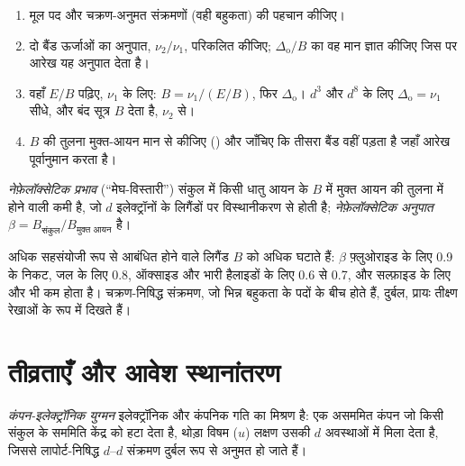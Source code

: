 \begin{method}[तानाबे--सुगानो आरेख पढ़ना]\label{met:b3:complex-spectra-magnetism:read-ts}
\begin{enumerate}
  \item मूल पद और चक्रण-अनुमत संक्रमणों (वही
        बहुकता) की पहचान कीजिए।
  \item दो बैंड ऊर्जाओं का अनुपात, $\nu_2/\nu_1$, परिकलित कीजिए; $\Delta_{\mathrm o}/B$ का वह मान ज्ञात कीजिए
        जिस पर आरेख यह अनुपात देता है।
  \item वहाँ $E/B$ पढ़िए, $\nu_1$ के लिए: $B = \nu_1/(E/B)$, फिर $\Delta_{\mathrm o}$। $d^3$ और $d^8$ के लिए $\Delta_{\mathrm o} = \nu_1$
        सीधे, और बंद सूत्र $B$ देता है, $\nu_2$ से।
  \item $B$ की तुलना मुक्त-आयन मान से कीजिए () और जाँचिए कि
        तीसरा बैंड वहीं पड़ता है जहाँ आरेख पूर्वानुमान करता है।
\end{enumerate}
\end{method}

\begin{definition}[नेफ़ेलॉक्सेटिक प्रभाव]\label{def:b3:complex-spectra-magnetism:nephelauxetic}
\emph{नेफ़ेलॉक्सेटिक प्रभाव} (``मेघ-विस्तारी'')
संकुल में किसी धातु आयन के  $B$ में मुक्त आयन की तुलना में
होने वाली कमी है, जो $d$ इलेक्ट्रॉनों के
लिगैंडों पर विस्थानीकरण से होती है; \emph{नेफ़ेलॉक्सेटिक अनुपात} $\beta =
B_{\text{संकुल}}/B_{\text{मुक्त आयन}}$ है।
\end{definition}

अधिक सहसंयोजी रूप से आबंधित होने वाले लिगैंड $B$ को अधिक घटाते हैं: $\beta$ फ़्लुओराइड के लिए 0.9 के निकट, जल
के लिए 0.8, ऑक्साइड और भारी हैलाइडों के लिए 0.6 से 0.7, और सल्फ़ाइड के लिए और भी कम होता है।
चक्रण-निषिद्ध संक्रमण, जो भिन्न बहुकता के पदों के बीच होते हैं,
दुर्बल, प्रायः तीक्ष्ण रेखाओं के रूप में दिखते हैं।

\section{तीव्रताएँ और आवेश स्थानांतरण}

\begin{definition}[कंपन-इलेक्ट्रॉनिक युग्मन]\label{def:b3:complex-spectra-magnetism:vibronic-coupling}
\emph{कंपन-इलेक्ट्रॉनिक युग्मन} इलेक्ट्रॉनिक और
कंपनिक गति का मिश्रण है: एक असममित कंपन जो किसी संकुल के सममिति
केंद्र को हटा देता है, थोड़ा विषम ($u$) लक्षण उसकी $d$ अवस्थाओं में मिला देता है,
जिससे लापोर्ट-निषिद्ध $d$--$d$ संक्रमण दुर्बल रूप से अनुमत हो जाते हैं।
\end{definition}


